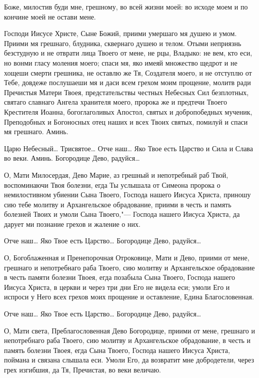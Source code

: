 \begin{mymulticols}
Боже, милостив буди мне, грешному, во всей жизни моей: во исходе моем и по кончине моей не остави мене. 


Господи Иисусе Христе, Сыне Божий, приими умершаго мя душею и умом. Приими мя грешнаго, блудника, сквернаго душею и телом. Отыми неприязнь безстудную и не отврати лица Твоего от мене, не рцы, Владыко: не вем, кто еси, но вонми гласу моления моего; спаси мя, яко имеяй множество щедрот и не хощеши смерти грешника, не оставлю же Тя, Создателя моего, и не отступлю от Тебе, довдеже послушаеши мя и даси всем грехом моим прощение, молитв ради Пречистыя Матери Твоея, предстательствы честных Небесных Сил безплотных, святаго славнаго Ангела хранителя моего, пророка же и предтечи Твоего Крестителя Иоанна, богоглаголивых Апостол, святых и добропобедных мученик, Преподобных и Богоносных отец наших и всех Твоих святых, помилуй и спаси мя грешнаго. Аминь.

Царю Небесный… Трисвятое… Отче наш… Яко Твое есть Царство и Сила и Слава во веки. Аминь. Богородице Дево, радуйся…


О, Мати Милосердая, Дево Марие, аз грешный и непотребный раб Твой, воспоминаючи Твоя болезни, егда Ты услышала от Симеона пророка о немилостивном убиении Сына Твоего, Господа нашего Иисуса Христа, приношу сию тебе молитву и Архангельское обрадование, приими в честь и память болезней Твоих и умоли Сына Твоего,"--- Господа нашего Иисуса Христа, да дарует ми познание грехов и жаление о них. 


Отче наш… Яко Твое есть Царство… Богородице Дево, радуйся…

О, Богоблаженная и Пренепорочная Отроковице, Мати и Дево, приими от мене, грешнаго и непотребнаго раба Твоего, сию молитву и Архангельское обрадование в честь памяти болезни Твоея, егда позабыла Сына Твоего, Господа нашего Иисуса Христа, в церкви и через три дни Его не видела еси; умоли Его и испроси у Него всех грехов моих прощение и оставление, Едина Благословенная. 


Отче наш… Яко Твое есть Царство… Богородице Дево, радуйся…

О, Мати света, Преблагословенная Дево Богородице, приими от мене, грешнаго и непотребнаго раба Твоего, сию молитву и Архангельское обрадование, в честь и память болезни Твоея, егда Сына Твоего, Господа нашего Иисуса Христа, поймана и связана слышала еси. Умоли Его, да возвратит мне добродетели, через грех изгибшия, да Тя, Пречистая, во веки величаю. 


\end{mymulticols}

